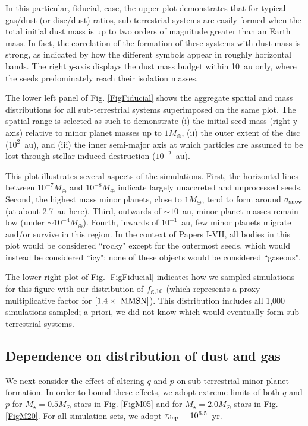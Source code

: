 \documentclass[useAMS,usenatbib]{mn2e}
\newcommand{\rev}{ }
\begin{document}
In this particular, fiducial, case, the upper plot demonstrates that for typical gas/dust (or disc/dust) ratios, sub-terrestrial systems are easily formed when the total {\rev initial} dust mass is up to two  orders of magnitude greater than an Earth mass. In fact, the correlation of the formation of these systems with dust mass is strong, as indicated by how the different symbols appear in roughly horizontal bands. The right $y$-axis displays the dust mass budget within 10~au only, where the seeds predominately reach their isolation masses.

The lower left panel of Fig. \ref{FigFiducial} shows the aggregate spatial and mass distributions for all sub-terrestrial systems superimposed on the same plot. The spatial range is selected as such to demonstrate (i) the initial seed mass (right y-axis) relative to minor planet masses up to $1M_{\oplus}$, (ii) the outer extent of the disc ($10^2$~au), and (iii) the inner semi-major axis at which particles are assumed to be lost through stellar-induced destruction ($10^{-2}$~au). 

This plot illustrates several aspects of the simulations. First, the horizontal lines between $10^{-7}M_{\oplus}$ and $10^{-8}M_{\oplus}$ indicate largely unaccreted and unprocessed seeds. Second, the highest mass minor planets, close to $1M_{\oplus}$, tend to form around $a_{\rm snow}$ (at about 2.7~au here). Third, outwards of $\sim 10$~au, minor planet masses remain low (under $\sim10^{-4}M_{\oplus}$). Fourth, inwards of $10^{-1}$~au, few minor planets migrate and/or survive in this region. In the context of Papers I-VII, all bodies in this plot would be considered ``rocky" except for the outermost seeds, which would instead be considered ``icy"; none of these objects would be considered ``gaseous".

The lower-right plot of Fig. \ref{FigFiducial} indicates how we sampled simulations for this figure with our distribution of $f_{\rm g, 10}$ (which represents a proxy multiplicative factor for $\left[1.4\times~{\rm MMSN}\right]$). This distribution includes all 1,000 simulations sampled; a priori, we did not know which would eventually form sub-terrestrial systems.

\subsection{Dependence on distribution of dust and gas}

We next consider the effect of altering $q$ and $p$ on sub-terrestrial minor planet formation. In order to bound these effects, we adopt extreme limits of both $q$ and $p$ for $M_{\star} = 0.5M_{\odot}$ stars in Fig. \ref{FigM05} and for $M_{\star} = 2.0M_{\odot}$ stars in Fig. \ref{FigM20}. For all simulation sets, we adopt $\tau_{\rm dep} = 10^{6.5}$~yr.
\end{document}
